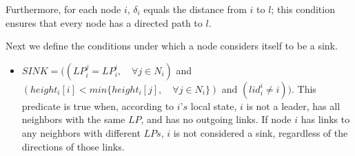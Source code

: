 \documentclass{article}
\begin{document}
Furthermore, for each node $i$, $\delta _i$ equals the distance from $i$ to $l$; this condition ensures that every node has a directed path to $l$.

Next we define the conditions under which a node considers itself to be a sink.
\begin{itemize}
\item $SINK = ((LP_i ^j = LP_i ^i, \quad \forall j \in N_i)$ and $(height_i[i] < min \lbrace height_i[j],\quad \forall j \in N_i \rbrace)$ and $(lid_i ^i \neq i)).$
This predicate is true when, according to $i’s$ local state, $i$ is not a leader, has all neighbors with the same $LP$, and has no outgoing links. If node $i$ has links to any neighbors with different $LPs$, $i$ is not considered a sink, regardless of the directions of those links.
\end{itemize}
\end{document}
